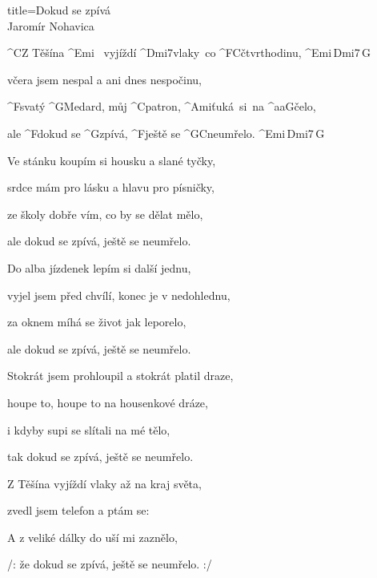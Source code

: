 \begin{song}{title=\predtitle\centering Dokud se zpívá \\\large Jaromír Nohavica  \vspace*{-0.3cm}}  %
\begin{centerjustified}
\nejnejvetsi

\sloka
	^{C}Z Těšína ^{Emi\,\,\,\,\,}vyjíždí ^{Dmi7\z}vlaky~co ^{F{\z}C}čtvrthodinu, ^{Emi\,Dmi7\,G}

	včera jsem nespal a ani dnes nespočinu,

	^{F}svatý ^{G}Medard, můj ^{C}patron, ^{\z Ami\:\:\:}ťuká~si~na ^{{\color{white}aa}G}čelo,

	ale ^{F}dokud se ^{G}zpívá, ^{F}ještě se ^{G{\z}C}neumřelo. ^{Emi\,Dmi7\,G}

\sloka
	Ve stánku koupím si housku a slané tyčky,

	srdce mám pro lásku a hlavu pro písničky,

	ze školy dobře vím, co by se dělat mělo,

	ale dokud se zpívá, ještě se neumřelo.

\sloka
	Do alba jízdenek lepím si další jednu,

	vyjel jsem před chvílí, konec je v nedohlednu,

	za oknem míhá se život jak leporelo,

	ale dokud se zpívá, ještě se neumřelo.

\sloka
	Stokrát jsem prohloupil a stokrát platil draze,

	houpe to, houpe to na housenkové dráze,

	i kdyby supi se slítali na mé tělo,

	tak dokud se zpívá, ještě se neumřelo.

\sloka
	Z Těšína vyjíždí vlaky až na kraj světa,

	zvedl jsem telefon a ptám se: 

	A z veliké dálky do uší mi zaznělo,

	/: že dokud se zpívá, ještě se neumřelo. :/


\end{centerjustified}

\centering
{}

\setcounter{Slokočet}{0}
\end{song}
